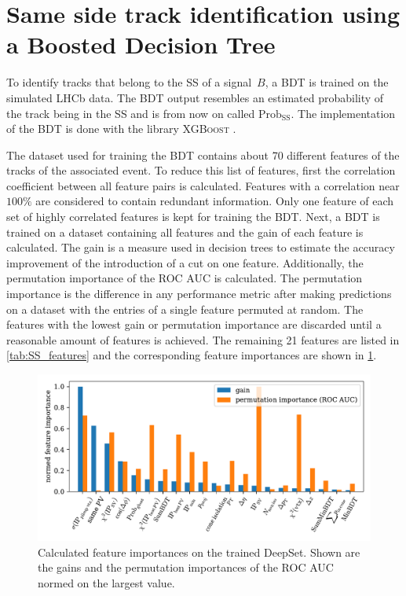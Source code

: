\section{Same side track identification using a Boosted Decision Tree}
\label{sec:SS_classifier}

To identify tracks that belong to the SS of a signal~$B$, a BDT is trained on the simulated LHCb data. 
The BDT output resembles an estimated probability of the track being in the SS and is from now on called $\text{Prob}_\text{SS}$.
The implementation of the BDT is done with the library \textsc{XGBoost} \cite{xgboost}.

The dataset used for training the BDT contains about 70 different features of the tracks of the associated event.
To reduce this list of features, first the correlation coefficient between all feature pairs is calculated.
Features with a correlation near $100\%$ are considered to contain redundant information.
Only one feature of each set of highly correlated features is kept for training the BDT.
Next, a BDT is trained on a dataset containing all features and the gain of each feature is calculated.
The gain is a measure used in decision trees to estimate the accuracy improvement of the introduction of a cut on one feature.
Additionally, the permutation importance of the ROC AUC is calculated.
The permutation importance is the difference in any performance metric after making predictions on a dataset with the entries of a single feature permuted at random.
The features with the lowest gain or permutation importance are discarded until a reasonable amount of features is achieved.
The remaining 21 features are listed in \cref{tab:SS_features} and the corresponding feature importances are shown in \cref{fig:SS_importances}.

\begin{figure}
    \centering
    \includegraphics[width=\textwidth]{images/SS_feature_importances.pdf}
    \caption{Calculated feature importances on the trained DeepSet. Shown are the gains and the permutation importances of the ROC AUC normed on the largest value.}
    \label{fig:SS_importances}
\end{figure}

